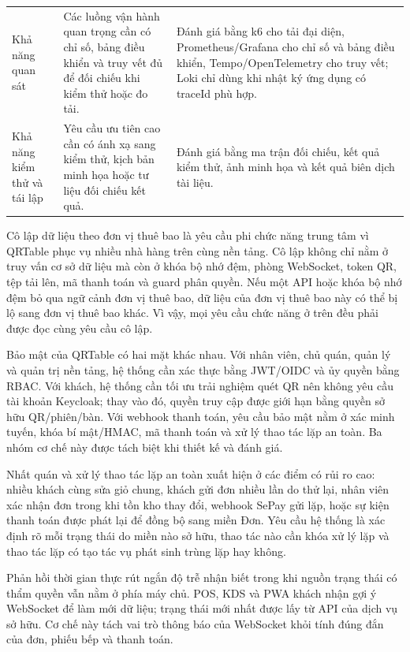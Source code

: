 \begin{longtable}{@{}>{\raggedright\arraybackslash}p{}>{\raggedright\arraybackslash}p{}>{\raggedright\arraybackslash}p{}@{}}
\addlinespace
Khả năng quan sát & Các luồng vận hành quan trọng cần có chỉ số, bảng điều khiển và truy vết đủ để đối chiếu khi kiểm thử hoặc đo tải. & Đánh giá bằng k6 cho tải đại diện, Prometheus/Grafana cho chỉ số và bảng điều khiển, Tempo/OpenTelemetry cho truy vết; Loki chỉ dùng khi nhật ký ứng dụng có traceId phù hợp. \\
\addlinespace
Khả năng kiểm thử và tái lập & Yêu cầu ưu tiên cao cần có ánh xạ sang kiểm thử, kịch bản minh họa hoặc tư liệu đối chiếu kết quả. & Đánh giá bằng ma trận đối chiếu, kết quả kiểm thử, ảnh minh họa và kết quả biên dịch tài liệu. \\
\bottomrule
\end{longtable}

Cô lập dữ liệu theo đơn vị thuê bao là yêu cầu phi chức năng trung tâm vì QRTable phục vụ nhiều nhà hàng trên cùng nền tảng. Cô lập không chỉ nằm ở truy vấn cơ sở dữ liệu mà còn ở khóa bộ nhớ đệm, phòng WebSocket, token QR, tệp tải lên, mã thanh toán và guard phân quyền. Nếu một API hoặc khóa bộ nhớ đệm bỏ qua ngữ cảnh đơn vị thuê bao, dữ liệu của đơn vị thuê bao này có thể bị lộ sang đơn vị thuê bao khác. Vì vậy, mọi yêu cầu chức năng ở trên đều phải được đọc cùng yêu cầu cô lập.

Bảo mật của QRTable có hai mặt khác nhau. Với nhân viên, chủ quán, quản lý và quản trị nền tảng, hệ thống cần xác thực bằng JWT/OIDC và ủy quyền bằng RBAC. Với khách, hệ thống cần tối ưu trải nghiệm quét QR nên không yêu cầu tài khoản Keycloak; thay vào đó, quyền truy cập được giới hạn bằng quyền sở hữu QR/phiên/bàn. Với webhook thanh toán, yêu cầu bảo mật nằm ở xác minh tuyến, khóa bí mật/HMAC, mã thanh toán và xử lý thao tác lặp an toàn. Ba nhóm cơ chế này được tách biệt khi thiết kế và đánh giá.

Nhất quán và xử lý thao tác lặp an toàn xuất hiện ở các điểm có rủi ro cao: nhiều khách cùng sửa giỏ chung, khách gửi đơn nhiều lần do thử lại, nhân viên xác nhận đơn trong khi tồn kho thay đổi, webhook SePay gửi lặp, hoặc sự kiện thanh toán được phát lại để đồng bộ sang miền Đơn. Yêu cầu hệ thống là xác định rõ mỗi trạng thái do miền nào sở hữu, thao tác nào cần khóa xử lý lặp và thao tác lặp có tạo tác vụ phát sinh trùng lặp hay không.

Phản hồi thời gian thực rút ngắn độ trễ nhận biết trong khi nguồn trạng thái có thẩm quyền vẫn nằm ở phía máy chủ. POS, KDS và PWA khách nhận gợi ý WebSocket để làm mới dữ liệu; trạng thái mới nhất được lấy từ API của dịch vụ sở hữu. Cơ chế này tách vai trò thông báo của WebSocket khỏi tính đúng đắn của đơn, phiếu bếp và thanh toán.

